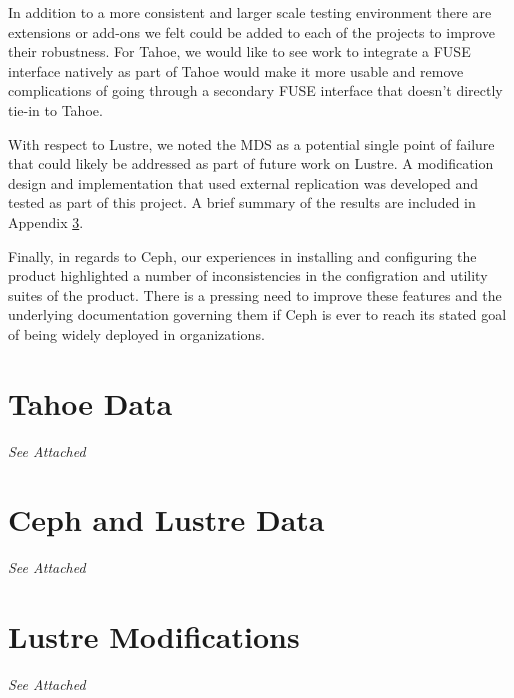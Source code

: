 \documentclass[11pt]{article}
\begin{document}
In addition to a more consistent and larger scale testing environment there 
are extensions or add-ons we felt could be added to each of the projects to
improve their robustness. For Tahoe, we would like to see work to integrate 
a FUSE interface natively as part of Tahoe would make it more usable and 
remove complications of going through a secondary FUSE interface that doesn't 
directly tie-in to Tahoe. 

With respect to Lustre, we noted the MDS as a potential single point of 
failure that could likely be addressed as part of future work on Lustre. A 
modification design and implementation that used external replication was 
developed and tested as part of this project. A brief summary of the results 
are included in Appendix \ref{sec:LustreMod}.

Finally, in regards to Ceph, our experiences in installing and configuring 
the product highlighted a number of inconsistencies in the configration and 
utility suites of the product. There is a pressing need to improve these 
features and the underlying documentation governing them if Ceph is ever to 
reach its stated goal of being widely deployed in organizations. 

\nocite{*}


\appendix

\pagebreak
\section{Tahoe Data}
\label{sec:TahoeData}

\emph{See Attached}




\pagebreak
\section{Ceph and Lustre Data}
\label{sec:CLData}

\emph{See Attached}



\pagebreak
\section{Lustre Modifications}
\label{sec:LustreMod}

\emph{See Attached}


\end{document}
